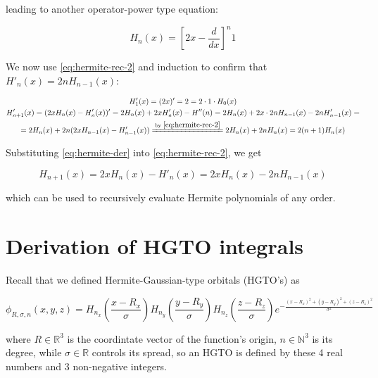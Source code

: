 \documentclass{article}
\newcommand{\equalby}[1]{\xlongequal{\text{by }\eqref{#1}}}
\begin{document}
\begin{appendices}
leading to another operator-power type equation:

\begin{equation}
H_n(x) = \left[2x - \frac{d}{dx}\right]^n 1
\end{equation}

We now use \eqref{eq:hermite-rec-2} and induction to confirm that \begin{math}H'_n(x) = 2nH_{n-1}(x)\end{math}:

\begin{equation} \label{eq:hermite-der}
\begin{gathered}
H'_1(x) = (2x)' = 2 = 2\cdot 1\cdot H_0(x) \\
H'_{n+1}(x) = (2xH_n(x) - H'_n(x))' = 2H_n(x) + 2xH'_n(x) - H''(n) = 2H_n(x) + 2x\cdot 2nH_{n-1}(x) - 2nH'_{n-1}(x) = \\
= 2H_n(x) + 2n(2xH_{n-1}(x) - H'_{n-1}(x)) \equalby{eq:hermite-rec-2} 2H_n(x) + 2nH_n(x) = 2(n+1)H_n(x)
\end{gathered}
\end{equation}

Substituting \eqref{eq:hermite-der} into \eqref{eq:hermite-rec-2}, we get

\begin{equation} \label{eq:hermite-rec}
H_{n+1}(x) = 2xH_n(x) - H'_n(x) = 2xH_n(x) - 2nH_{n-1}(x)
\end{equation}

which can be used to recursively evaluate Hermite polynomials of any order.

\newpage

\section{Derivation of HGTO integrals} \label{apx:integrals}

Recall that we defined Hermite-Gaussian-type orbitals (HGTO's) as

\begin{equation}
\phi_{R,\sigma,n}(x,y,z) = H_{n_x}\left(\frac{x-R_x}{\sigma}\right)H_{n_y}\left(\frac{y-R_y}{\sigma}\right)H_{n_z}\left(\frac{z-R_z}{\sigma}\right) e^{-\frac{(x-R_x)^2+(y-R_y)^2+(z-R_z)^2}{\sigma^2}}
\end{equation}

where \begin{math}R \in \mathbb{R}^3\end{math} is the coordintate vector of the function's origin, \begin{math}n\in\mathbb{N}^3\end{math} is its degree, while \begin{math}\sigma \in \mathbb{R}\end{math} controls its spread, so an HGTO is defined by these 4 real numbers and 3 non-negative integers.


\end{appendices}
\end{document}
